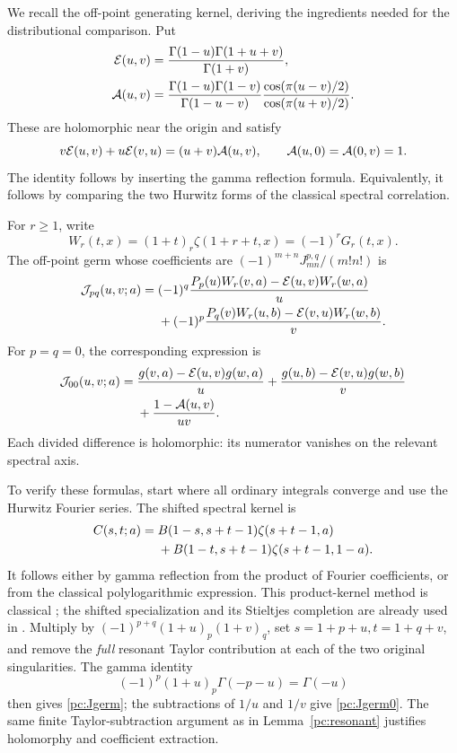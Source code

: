 We recall the off-point generating kernel, deriving the ingredients needed for the distributional comparison. Put
\begin{align}
 \mathcal E(u,v)&=\frac{\Gamma(1-u)\Gamma(1+u+v)}{\Gamma(1+v)},\label{pc:E}\\
 \mathcal A(u,v)&=\frac{\Gamma(1-u)\Gamma(1-v)}{\Gamma(1-u-v)}
 \frac{\cos(\pi(u-v)/2)}{\cos(\pi(u+v)/2)}.\label{pc:A}
\end{align}
These are holomorphic near the origin and satisfy
\begin{equation}\label{pc:EA}
 v\mathcal E(u,v)+u\mathcal E(v,u)=(u+v)\mathcal A(u,v),\qquad
 \mathcal A(u,0)=\mathcal A(0,v)=1.
\end{equation}
The identity follows by inserting the gamma reflection formula. Equivalently, it follows by comparing the two Hurwitz forms of the classical spectral correlation.

For $r\ge1$, write
\[
 W_r(t,x)=(1+t)_r\zeta(1+r+t,x)=(-1)^rG_r(t,x).
\]
The off-point germ whose coefficients are $(-1)^{m+n}J_{mn}^{p,q}/(m!n!)$ is
\begin{align}\label{pc:Jgerm}
 \mathcal J_{pq}(u,v;a)
 ={}&(-1)^q\frac{P_p(u)W_r(v,a)-\mathcal E(u,v)W_r(w,a)}u\\
 &+(-1)^p\frac{P_q(v)W_r(u,b)-\mathcal E(v,u)W_r(w,b)}v.\notag
\end{align}
For $p=q=0$, the corresponding expression is
\begin{align}\label{pc:Jgerm0}
 \mathcal J_{00}(u,v;a)
 ={}&\frac{g(v,a)-\mathcal E(u,v)g(w,a)}u
   +\frac{g(u,b)-\mathcal E(v,u)g(w,b)}v\notag\\
 &+\frac{1-\mathcal A(u,v)}{uv}.
\end{align}
Each divided difference is holomorphic: its numerator vanishes on the relevant spectral axis.

To verify these formulas, start where all ordinary integrals converge and use the Hurwitz Fourier series. The shifted spectral kernel is
\begin{align}\label{pc:beta}
 C(s,t;a)={}&B(1-s,s+t-1)\zeta(s+t-1,a)\notag\\
 &+B(1-t,s+t-1)\zeta(s+t-1,1-a).
\end{align}
It follows either by gamma reflection from the product of Fourier coefficients, or from the classical polylogarithmic expression. This product-kernel method is classical \cite{stieltjes:EspinosaMoll1}; the shifted specialization and its Stieltjes completion are already used in \cite{pcc:reports}. Multiply by $(-1)^{p+q}(1+u)_p(1+v)_q$, set $s=1+p+u,t=1+q+v$, and remove the \emph{full} resonant Taylor contribution at each of the two original singularities. The gamma identity
\[
 (-1)^p(1+u)_p\Gamma(-p-u)=\Gamma(-u)
\]
then gives \eqref{pc:Jgerm}; the subtractions of $1/u$ and $1/v$ give \eqref{pc:Jgerm0}. The same finite Taylor-subtraction argument as in Lemma~\ref{pc:resonant} justifies holomorphy and coefficient extraction.

